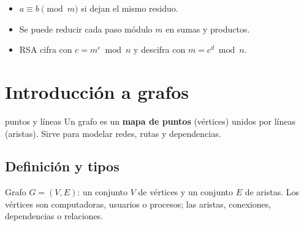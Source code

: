 
\begin{tmresumen}
\begin{itemize}
\item $a\equiv b\pmod m$ si dejan el mismo residuo.
\item Se puede reducir cada paso m\'odulo $m$ en sumas y productos.
\item RSA cifra con $c=m^e\bmod n$ y descifra con $m=c^d\bmod n$.
\end{itemize}
\end{tmresumen}

\section{Introducci\'on a grafos}
\label{sec:2-6}

\begin{tmconcepto}{puntos y l\'ineas}
Un grafo es un \textbf{mapa de puntos} (v\'ertices) unidos por l\'ineas (aristas). Sirve para modelar redes, rutas y dependencias.
\end{tmconcepto}


\subsection{Definici\'on y tipos}
\begin{tmdef}{Grafo}
$G=(V, E)$: un conjunto $V$ de v\'ertices y un conjunto $E$ de aristas. Los v\'ertices son computadoras, usuarios o procesos; las aristas, conexiones, dependencias o relaciones.
\end{tmdef}

